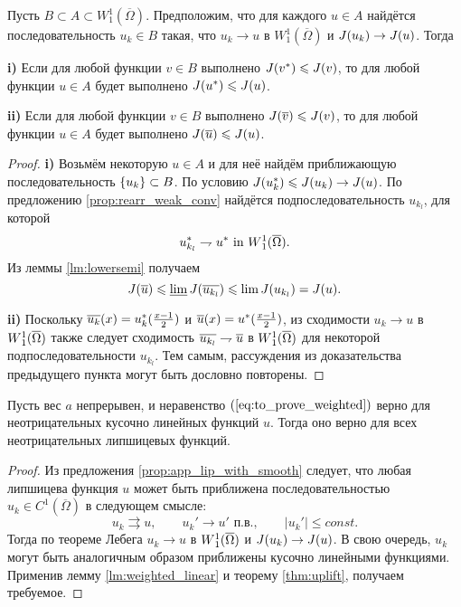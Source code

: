 \begin{thm}
\label{thm:uplift}
Пусть $B \subset A \subset W^1_1(\overline{\Omega})$.
Предположим, что для каждого $u \in A$ найдётся последовательность $u_k \in B$ такая,
что $u_k \to u$ в $W^1_1(\overline{\Omega})$ и $J( u_k ) \to J( u )$.
Тогда

\textbf{\textup{i)}}
Если для любой функции $v \in B$ выполнено $J( {v^*} ) \leqslant J( v )$,
то для любой функции $u \in A$ будет выполнено $J( {u^*} ) \leqslant J( u )$.

\textbf{\textup{ii)}}
Если для любой функции $v \in B$ выполнено $\IWg( \mon{v} ) \le \IWg( v )$,
то для любой функции $u \in A$ будет выполнено $\IWg( \mon{u} ) \le \IWg( u )$.
\end{thm}

\begin{proof}
\textbf{\textup{i)}}
Возьмём некоторую $u \in A$ и для неё найдём приближающую последовательность $\{u_k\} \subset B$.
По условию $J({u_k^*}) \leqslant J(u_k) \to J(u)$.
По предложению \ref{prop:rearr_weak_conv} найдётся подпоследовательность $u_{k_l}$, для которой
$$
\symm{u_{k_l}} \rightharpoondown \symm{u} \text{ in } \W(\overline{\Omega}).
$$
Из леммы \ref{lm:lowersemi} получаем
$$
\IWg(\mon{u}) \le \varliminf \IWg(\mon{u_{k_l}}) \le \lim \IWg(u_{k_l}) = \IWg(u).
$$

\textbf{\textup{ii)}}
Поскольку $\mon{u_k}( x ) = \symm{u_k}( \frac{x - 1}{2} )$ и $\mon{u}( x ) = \symm{u}( \frac{x - 1}{2} )$,
из сходимости $u_k \to u$ в $\W(\overline{\Omega})$ также следует сходимость $\mon{u_{k_l}} \rightharpoondown \mon{u}$ в $\W(\overline{\Omega})$
для некоторой подпоследовательности $u_{k_l}$.
Тем самым, рассуждения из доказательства предыдущего пункта могут быть дословно повторены.
\end{proof}

\begin{cor}
Пусть вес $a$ непрерывен, и неравенство $(\ref{eq:to_prove_weighted})$ верно для неотрицательных кусочно линейных функций $u$.
Тогда оно верно для всех неотрицательных липшицевых функций.
\end{cor}
\begin{proof}
Из предложения \ref{prop:app_lip_with_smooth} следует, что любая липшицева функция $u$ может быть приближена последовательностью $u_k \in C^1(\overline{\Omega})$ в следующем смысле:
$$
u_k \rightrightarrows u, \qquad u_k' \to u' \text{ п.в.}, \qquad |u_k'| \le const.
$$
Тогда по теореме Лебега $u_k \to u$ в $\W(\overline{\Omega})$ и $J( u_k ) \to J( u )$.
В свою очередь, $u_k$ могут быть аналогичным образом приближены кусочно линейными функциями.
Применив лемму \ref{lm:weighted_linear} и теорему \ref{thm:uplift}, получаем требуемое.
\end{proof}
